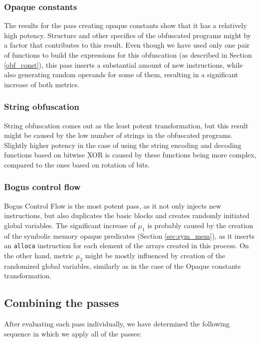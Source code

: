 \documentclass[
  digital, %
  notable,   %
  twoside, %
  nolof,     %
  nolot,     %
]{fithesis3}
\theoremstyle{definition}
\begin{document}
\subsubsection{Opaque constants}
The results for the pass creating opaque constants show that it has a relatively high potency. Structure and other specifics of the obfuscated programs might by a factor that contributes to this result. Even though we have used only one pair of functions to build the expressions for this obfuscation (as described in Section \ref{obf_const}), this pass inserts a substantial amount of new instructions, while also generating random operands for some of them, resulting in a significant increase of both metrics. 

\subsubsection{String obfuscation}
String obfuscation comes out as the least potent transformation, but this result might be caused by the low number of strings in the obfuscated programs. Slightly higher potency in the case of using the string encoding and decoding functions based on bitwise XOR is caused by these functions being more complex, compared to the ones based on rotation of bits. 

\subsubsection{Bogus control flow}
Bogus Control Flow is the most potent pass, as it not only injects new instructions, but also duplicates the basic blocks and creates randomly initiated global variables. The significant increase of $\mu_1$ is probably caused by the creation of the symbolic memory opaque predicates (Section \ref{sec:sym_mem}), as it inserts an \texttt{alloca} instruction for each element of the arrays created in this process. On the other hand, metric $\mu_2$ might be mostly influenced by creation of the randomized global variables, similarly as in the case of the Opaque constants transformation. 

\subsection{Combining the passes} \label{sec:combine}

After evaluating each pass individually, we have determined the following sequence in which we apply all of the passes: \\
\end{document}
